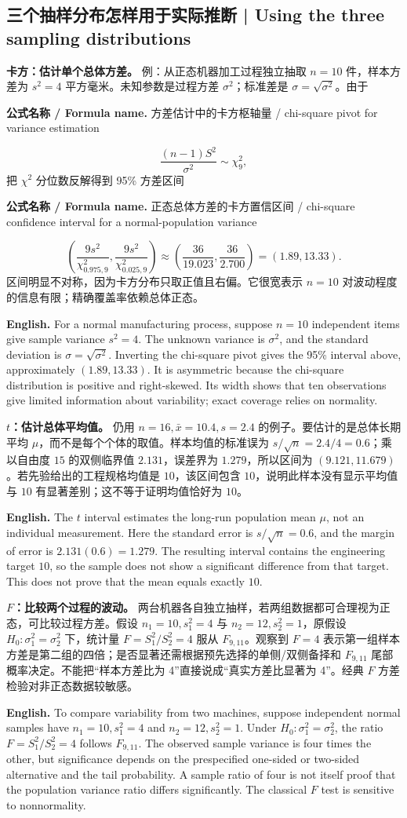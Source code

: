 \documentclass[UTF8,11pt,a4paper]{ctexart}
\newcommand{\EN}[1]{\par\noindent\textbf{English.} #1\par}
\newcommand{\FORMULA}[2]{\par\noindent\textbf{公式名称 / Formula name.} #1 / #2\par}
\begin{document}
\subsection{三个抽样分布怎样用于实际推断 | Using the three sampling distributions}
\noindent\textbf{卡方：估计单个总体方差。} 例：从正态机器加工过程独立抽取 $n=10$ 件，样本方差为 $s^2=4$ 平方毫米。未知参数是过程方差 $\sigma^2$；标准差是 $\sigma=\sqrt{\sigma^2}$。由于
\FORMULA{方差估计中的卡方枢轴量}{chi-square pivot for variance estimation}
\[
\frac{(n-1)S^2}{\sigma^2}\sim\chi^2_9,
\]
把 $\chi^2$ 分位数反解得到 95\% 方差区间
\FORMULA{正态总体方差的卡方置信区间}{chi-square confidence interval for a normal-population variance}
\[
\left(\frac{9s^2}{\chi^2_{0.975,9}},\frac{9s^2}{\chi^2_{0.025,9}}\right)
\approx\left(\frac{36}{19.023},\frac{36}{2.700}\right)
=(1.89,13.33).
\]
区间明显不对称，因为卡方分布只取正值且右偏。它很宽表示 $n=10$ 对波动程度的信息有限；精确覆盖率依赖总体正态。
\EN{For a normal manufacturing process, suppose $n=10$ independent items give sample variance $s^2=4$. The unknown variance is $\sigma^2$, and the standard deviation is $\sigma=\sqrt{\sigma^2}$. Inverting the chi-square pivot gives the 95\% interval above, approximately $(1.89,13.33)$. It is asymmetric because the chi-square distribution is positive and right-skewed. Its width shows that ten observations give limited information about variability; exact coverage relies on normality.}

\noindent\textbf{$t$：估计总体平均值。} 仍用 $n=16,\bar x=10.4,s=2.4$ 的例子。要估计的是总体长期平均 $\mu$，而不是每个个体的取值。样本均值的标准误为 $s/\sqrt n=2.4/4=0.6$；乘以自由度 $15$ 的双侧临界值 $2.131$，误差界为 $1.279$，所以区间为 $(9.121,11.679)$。若先验给出的工程规格均值是 $10$，该区间包含 $10$，说明此样本没有显示平均值与 $10$ 有显著差别；这不等于证明均值恰好为 $10$。
\EN{The $t$ interval estimates the long-run population mean $\mu$, not an individual measurement. Here the standard error is $s/\sqrt n=0.6$, and the margin of error is $2.131(0.6)=1.279$. The resulting interval contains the engineering target $10$, so the sample does not show a significant difference from that target. This does not prove that the mean equals exactly $10$.}

\noindent\textbf{$F$：比较两个过程的波动。} 两台机器各自独立抽样，若两组数据都可合理视为正态，可比较过程方差。假设 $n_1=10,s_1^2=4$ 与 $n_2=12,s_2^2=1$，原假设 $H_0:\sigma_1^2=\sigma_2^2$ 下，统计量 $F=S_1^2/S_2^2=4$ 服从 $F_{9,11}$。观察到 $F=4$ 表示第一组样本方差是第二组的四倍；是否显著还需根据预先选择的单侧/双侧备择和 $F_{9,11}$ 尾部概率决定。不能把“样本方差比为 4”直接说成“真实方差比显著为 4”。经典 $F$ 方差检验对非正态数据较敏感。
\EN{To compare variability from two machines, suppose independent normal samples have $n_1=10,s_1^2=4$ and $n_2=12,s_2^2=1$. Under $H_0:\sigma_1^2=\sigma_2^2$, the ratio $F=S_1^2/S_2^2=4$ follows $F_{9,11}$. The observed sample variance is four times the other, but significance depends on the prespecified one-sided or two-sided alternative and the tail probability. A sample ratio of four is not itself proof that the population variance ratio differs significantly. The classical $F$ test is sensitive to nonnormality.}
\end{document}
